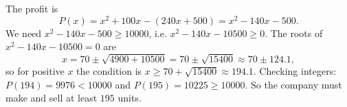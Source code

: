 The profit is
\[
P(x)=x^2+100x-(240x+500)=x^2-140x-500 .
\]
We need $x^2-140x-500\ge10000$, i.e. $x^2-140x-10500\ge0$. The roots of $x^2-140x-10500=0$ are
\[
x=70\pm\sqrt{4900+10500}=70\pm\sqrt{15400}\approx70\pm124.1 ,
\]
so for positive $x$ the condition is $x\ge70+\sqrt{15400}\approx194.1$. Checking integers: $P(194)=9976<10000$ and $P(195)=10225\ge10000$. So the company must make and sell at least $\boxed{195}$ units.
